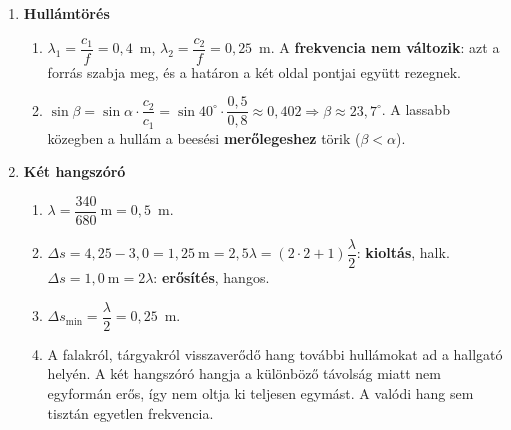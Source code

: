 \documentclass[11pt,a4paper]{article}
\begin{document}
\begin{enumerate}
\item \textbf{Hullámtörés}
  \begin{enumerate}
    \item $\lambda_1 = \dfrac{c_1}{f} = 0{,}4$~m, \quad $\lambda_2 = \dfrac{c_2}{f} = 0{,}25$~m.
      A \textbf{frekvencia nem változik}: azt a forrás szabja meg, és a határon a két oldal
      pontjai együtt rezegnek.
    \item $\sin\beta = \sin\alpha\cdot\dfrac{c_2}{c_1} = \sin 40^\circ\cdot\dfrac{0{,}5}{0{,}8}
      \approx 0{,}402 \Rightarrow \beta \approx 23{,}7^\circ$.
      A lassabb közegben a hullám a beesési \textbf{merőlegeshez} törik ($\beta < \alpha$).
  \end{enumerate}

\item \textbf{Két hangszóró}
  \begin{enumerate}
    \item $\lambda = \dfrac{340}{680}~\text{m} = 0{,}5$~m.
    \item $\Delta s = 4{,}25 - 3{,}0 = 1{,}25~\text{m} = 2{,}5\lambda = (2\cdot 2+1)\dfrac{\lambda}{2}$:
      \textbf{kioltás}, halk.\\
      $\Delta s = 1{,}0~\text{m} = 2\lambda$: \textbf{erősítés}, hangos.
    \item $\Delta s_\text{min} = \dfrac{\lambda}{2} = 0{,}25$~m.
    \item A falakról, tárgyakról visszaverődő hang további hullámokat ad a hallgató helyén.
      A két hangszóró hangja a különböző távolság miatt nem egyformán erős, így nem
      oltja ki teljesen egymást. A valódi hang sem tisztán egyetlen frekvencia.
  \end{enumerate}


\end{enumerate}
\end{document}
